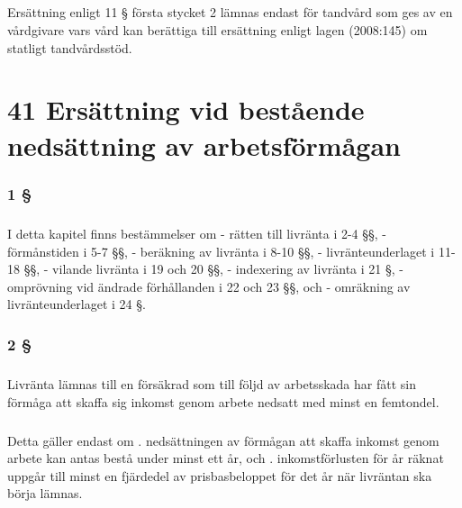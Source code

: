 \documentclass[a4paper,notitlepage,openany,10pt]{book}
\begin{document}
\paragraph*{}
Ersättning enligt 11 § första stycket 2 lämnas endast för tandvård som ges av en vårdgivare vars vård kan berättiga till ersättning enligt lagen (2008:145) om statligt tandvårdsstöd.
\chapter*{41 Ersättning vid bestående nedsättning av arbetsförmågan}
\subsection*{1 §}
\paragraph*{}
I detta kapitel finns bestämmelser om
\newline - rätten till livränta i 2-4 §§,
\newline - förmånstiden i 5-7 §§,
\newline - beräkning av livränta i 8-10 §§,
\newline - livränteunderlaget i 11-18 §§,
\newline - vilande livränta i 19 och 20 §§,
\newline - indexering av livränta i 21 §,
\newline - omprövning vid ändrade förhållanden i 22 och 23 §§, och
\newline - omräkning av livränteunderlaget i 24 §.
\subsection*{2 §}
\paragraph*{}
Livränta lämnas till en försäkrad som till följd av arbetsskada har fått sin förmåga att skaffa sig inkomst genom arbete nedsatt med minst en femtondel.
\paragraph*{}
Detta gäller endast om
. nedsättningen av förmågan att skaffa inkomst genom arbete kan antas bestå under minst ett år, och
. inkomstförlusten för år räknat uppgår till minst en fjärdedel av prisbasbeloppet för det år när livräntan ska börja lämnas.
\end{document}
